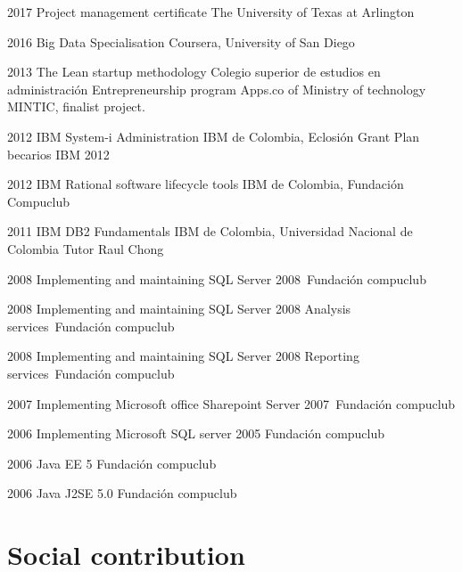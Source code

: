 \documentclass[]{friggeri-cv} %
\begin{document}
\begin{entrylist}
\begin{entrylist}

\entry
{2017}
{Project management certificate}
{The University of Texas at Arlington}
{}

\entry
{2016}
{Big Data Specialisation}
{Coursera, University of San Diego}
{}

\entry
{2013}
{The Lean startup methodology}
{Colegio superior de estudios en administración}
{Entrepreneurship program Apps.co of Ministry of technology MINTIC, finalist project.}

\entry
{2012}
{IBM System-i Administration}
{IBM de Colombia, Eclosión}
{Grant Plan becarios IBM 2012}

\entry
{2012}
{IBM Rational software lifecycle tools}
{IBM de Colombia, Fundación Compuclub}
{}

\entry
{2011}
{IBM DB2 Fundamentals}
{IBM de Colombia, Universidad Nacional de Colombia}
{Tutor Raul Chong}

\entry
{2008}
{Implementing and maintaining SQL Server 2008}\
{Fundación compuclub}
{}

\entry
{2008}
{Implementing and maintaining SQL Server 2008 Analysis services}\
{Fundación compuclub}
{}

\entry
{2008}
{Implementing and maintaining SQL Server 2008 Reporting services}\
{Fundación compuclub}
{}

\entry
{2007}
{Implementing Microsoft office Sharepoint Server 2007}\
{Fundación compuclub}
{}

\entry
{2006}
{Implementing Microsoft SQL server 2005}
{Fundación compuclub}
{}

\entry
{2006}
{Java EE 5}
{Fundación compuclub}
{}

\entry
{2006}
{Java J2SE 5.0}
{Fundación compuclub}
{}


\end{entrylist}


\section{Social contribution}

\begin{entrylist}


\end{entrylist}
\end{entrylist}
\end{document}

